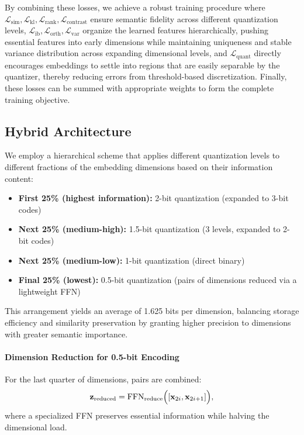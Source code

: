 By combining these losses, we achieve a robust training procedure where $\mathcal{L}_{\text{sim}}, \mathcal{L}_{\text{kl}}, \mathcal{L}_{\text{rank}}, \mathcal{L}_{\text{contrast}}$ ensure semantic fidelity across different quantization levels, 
$\mathcal{L}_{\text{ib}}, \mathcal{L}_{\text{orth}}, \mathcal{L}_{\text{var}}$ organize the learned features hierarchically, pushing essential features into early dimensions while maintaining uniqueness and stable variance distribution across expanding dimensional levels, and 
$\mathcal{L}_{\text{quant}}$ directly encourages embeddings to settle into regions that are easily separable by the quantizer, thereby reducing errors from threshold-based discretization.
Finally, these losses can be summed with appropriate weights to form the complete training objective.

\subsection{Hybrid Architecture}
\label{subsec:hybrid_architecture}

We employ a hierarchical scheme that applies different quantization levels to different fractions of the embedding dimensions based on their information content:

\begin{itemize}
    \item \textbf{First 25\% (highest information):} 2-bit quantization (expanded to 3-bit codes) 
    \item \textbf{Next 25\% (medium-high):} 1.5-bit quantization (3 levels, expanded to 2-bit codes) 
    \item \textbf{Next 25\% (medium-low):} 1-bit quantization (direct binary) 
    \item \textbf{Final 25\% (lowest):} 0.5-bit quantization (pairs of dimensions reduced via a lightweight FFN)
\end{itemize}

This arrangement yields an average of 1.625 bits per dimension, balancing storage efficiency and similarity preservation by granting higher precision to dimensions with greater semantic importance.

\paragraph{Dimension Reduction for 0.5-bit Encoding}
For the last quarter of dimensions, pairs are combined:
\begin{equation}
    \mathbf{z}_{\text{reduced}} = \text{FFN}_{\text{reduce}}\Bigl([\mathbf{x}_{2i}, \mathbf{x}_{2i+1}]\Bigr),
\end{equation}
where a specialized FFN preserves essential information while halving the dimensional load. 

